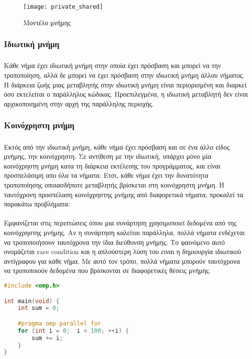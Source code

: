 \begin{figure}[h]
\texttt{[image: private\_shared]}
\captionsetup{justification=centering, singlelinecheck=false}
\caption{Μοντέλο μνήμης }
\label{fig:private_shared}
\end{figure}

\subsubsection{Ιδιωτική μνήμη}
\subparagraph{}
Κάθε νήμα έχει ιδιωτική μνήμη στην οποία έχει πρόσβαση και μπορεί να την τροποποίηση, αλλά δε μπορεί να έχει πρόσβαση στην ιδιωτική μνήμη άλλου νήματος. Η διάρκεια ζωής μιας μεταβλητής στην ιδιωτική μνήμη είναι περιορισμένη και διαρκεί όσο εκτελείται ο παράλληλος κώδικας. Προεπιλεγμένα, η ιδιωτική μεταβλητή δεν είναι αρχικοποιημένη στην αρχή της παράλληλης περιοχής\cite{thenextstep9}.

\clearpage
\subsubsection{Κοινόχρηστη μνήμη}
\subparagraph{}
Εκτός από την ιδιωτική μνήμη, κάθε νήμα έχει πρόσβαση και σε ένα άλλο είδος μνήμης, την  κοινόχρηστη. Σε αντίθεση με την ιδιωτική, υπάρχει μόνο μία κοινόχρηστη μνήμη κατα τη διάρκεια εκτέλεσης του προγράμματος, και είναι προσπελάσιμη απο όλα τα νήματα. Ετσι, κάθε νήμα έχει την δυνατότητα τροποποίησης οποιασδήποτε μεταβλητής βρίσκεται στη κοινόχρηστη μνήμη.
Η ταυτόχρονη προσπέλαση κοινόχρηστης μνήμης από διαφορετικά νήματα, προκαλεί τα παρακάτω προβλήματα:

\paragraph{}

\begin{center}
	\begin{minipage}[t]{0.45\linewidth}
Εμφανίζεται στις περιπτώσεις όπου μια συνάρτηση χρησιμοποιεί δεδομένα από της κοινόχρηστης μνήμης. 
Αν η συνάρτηση καλείται παράλληλα, πολλά νήματα ενδέχεται να τροποποιήσουν ταυτόχρονα την ίδια διεύθυνση μνήμης. Το φαινόμενο αυτό ονομάζεται race condition και η απλούστερη λύση του ειναι η δημιουργία ιδιωτικού αντίγραφου για κάθε νήμα. Με αυτό τον τρόπο, πολλά νήματα μπορούν ταυτόχρονα να τροποποιούν δεδομένα που βρίσκονται σε διαφορετικές θέσεις μνήμης.
	\end{minipage}
	\qquad
	\begin{minipage}[t]{0.47\linewidth}
		\begin{lstlisting}[tabsize=2, basicstyle=\small, language=C++, caption={\el{Παράδειγμα κώδικα με} race condition}, frame=tb]
#include <omp.h>

int main(void) {	
	int sum = 0;

	#pragma omp parallel for
	for (int i = 0;  i < 100; ++i) {
		sum += i;		
	}
}
\end{lstlisting}
	\end{minipage}
\end{center}
\clearpage
